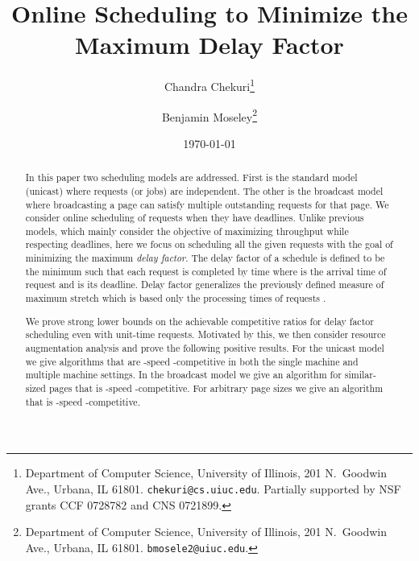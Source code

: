 \documentclass[11pt]{article}
\begin{document}
\title{Online Scheduling to Minimize the Maximum Delay Factor}
\author{
Chandra Chekuri\thanks{Department of Computer Science,
University of Illinois, 201 N.\ Goodwin Ave.,
Urbana, IL 61801. {\tt chekuri@cs.uiuc.edu}.
Partially supported by NSF grants CCF 0728782
 and CNS 0721899. }
\and
Benjamin Moseley\thanks{Department of Computer Science,
University of Illinois, 201 N.\ Goodwin Ave.,
Urbana, IL 61801. {\tt bmosele2@uiuc.edu}.
}
}
\date{\today}
\maketitle


\begin{abstract}
  In this paper two scheduling models are addressed. First is the
  standard model (unicast) where requests (or jobs) are
  independent. The other is the broadcast model where broadcasting a
  page can satisfy multiple outstanding requests for that page. We
  consider online scheduling of requests when they have deadlines.
  Unlike previous models, which mainly consider the objective of
  maximizing throughput while respecting deadlines, here we focus on
  scheduling all the given requests with the goal of minimizing the
  maximum {\em delay factor}. The delay factor of a schedule is
  defined to be the minimum  such that each request 
  is completed by time  where  is the
  arrival time of request  and  is its deadline. Delay factor
  generalizes the previously defined measure of maximum stretch which
  is based only the processing times of requests
  \cite{BenderCM98,BenderMR02}.

  We prove strong lower bounds on the achievable competitive ratios
  for delay factor scheduling even with unit-time requests. Motivated
  by this, we then consider resource augmentation analysis
  \cite{KalyanasundaramP95} and prove the following positive results.
  For the unicast model we give algorithms that are -speed
  -competitive in both the single machine and
  multiple machine settings. In the broadcast model we give an
  algorithm for similar-sized pages that is -speed -competitive. For arbitrary page sizes we give an
  algorithm that is -speed -competitive.
\end{abstract}

\setcounter{page}{0}
\thispagestyle{empty}
\clearpage
\end{document}
